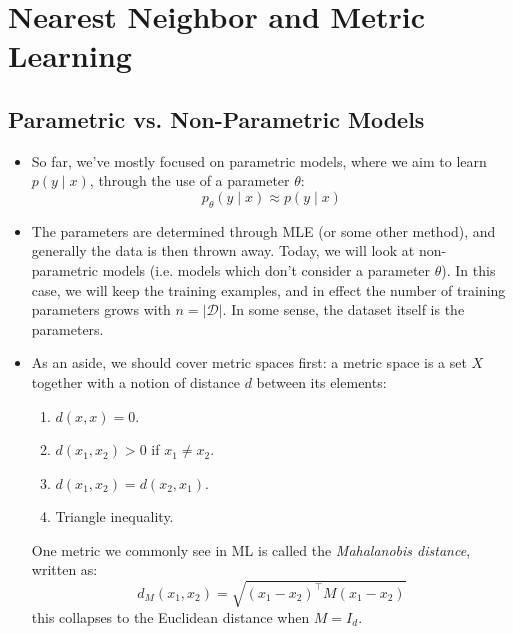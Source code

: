 \section{Nearest Neighbor and Metric Learning}
\subsection{Parametric vs. Non-Parametric Models}
\begin{itemize}
	\item So far, we've mostly focused on parametric models, where we aim to learn \( p(y \mid x) \), through
		the use of a parameter \( \theta \):
		\[
			p_{\theta}(y \mid x) \approx p(y \mid x)
		\]
	\item The parameters are determined through MLE (or some other method), and generally the data is then
		thrown away. Today, we will look at non-parametric models (i.e. models which don't consider a
		parameter \( \theta \)). In this case, we will keep the training examples, and in effect the number
		of training parameters grows with \( n = |\mathcal{D}| \). In some sense, the dataset itself is the
		parameters. 
	\item As an aside, we should cover metric spaces first: a metric space is a set \( X \) together with a
		notion of distance \( d \) between its elements:
		\begin{enumerate}[label=\arabic*.]
			\item \( d(x, x) = 0 \).
			\item \( d(x_1, x_2) > 0 \) if \( x_1 \neq x_2 \).
			\item \( d(x_1, x_2) = d(x_2, x_1) \).
			\item Triangle inequality. 
		\end{enumerate}
		One metric we commonly see in ML is called the \textit{Mahalanobis distance}, written as:
		\[
			d_M(x_1, x_2) = \sqrt{(x_1 - x_2)^{\top} M (x_1 - x_2)}
		\]
		this collapses to the Euclidean distance when \( M = I_d \).
\end{itemize}

